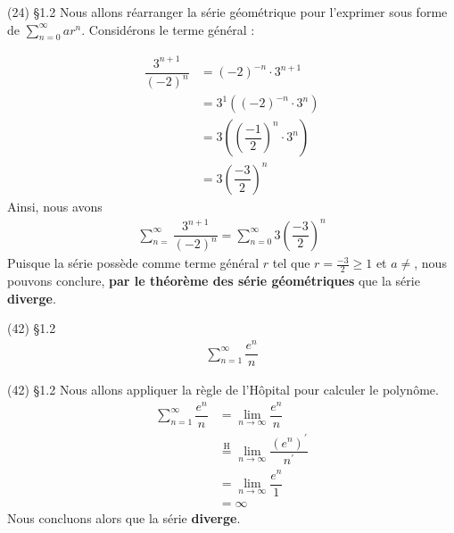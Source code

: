 \documentclass{report}
\begin{document}
\begin{multicols*}{3}
        \begin{Reponse}{(24) \S 1.2}{}
            Nous allons réarranger la série géométrique pour l'exprimer 
            sous forme de $\sum_{n=0}^{\infty }ar^n$. 
            Considérons le terme général : 

            \begin{align*}
                \dfrac{3^{n+1}}{(-2)^n} &= 
                (-2)^{-n}\cdot 3^{n+1} \\ 
                                    &=
                3^1\left( (-2)^{-n} \cdot 3^n \right) \\
                                    &= 
                3\left( \left(\dfrac{-1}{2}\right)^n \cdot 3^n \right) \\ 
                                    &= 
                3\left( \dfrac{-3}{2} \right)^n
            \end{align*}
            Ainsi, nous avons 
            \begin{align*}
                \sum_{n=}^{\infty}\dfrac{3^{n+1}}{(-2)^n} = 
                \sum_{n=0}^{\infty}3\left( \dfrac{-3}{2} \right)^n
            \end{align*}
            Puisque la série possède comme terme général $r$ tel que 
            $r =\frac{-3}{2} \geq 1$ et $a \neq$, nous pouvons 
            conclure, \textbf{par le théorème des série géométriques} 
            que la série \textbf{diverge}.   
           
        \end{Reponse}


        \begin{Exercice}{ (42) \S 1.2}{}
            \begin{align*}
                \sum_{n=1}^{\infty}\dfrac{e^n}{n}
            \end{align*}
        \end{Exercice}


        \begin{Reponse}{ (42) \S 1.2}{}
            Nous allons appliquer la règle de l'Hôpital pour calculer 
            le polynôme.  
            \begin{align*}
                \sum_{n=1}^{\infty}\dfrac{e^n}{n} &= 
                 \lim\limits_{n\to\infty}\dfrac{e^n}{n} \\ 
                                      &\overset{\mathrm{H}}{=}
            \lim\limits_{n\to\infty}\dfrac{(e^n)^{\prime}}{n^{\prime}} \\
                                    &=
            \lim\limits_{n\to\infty}\dfrac{e^n}{1} \\ 
                                    &= \infty
            \end{align*}
            Nous concluons alors que la série \textbf{diverge}.   
        \end{Reponse}




\end{multicols*}
\end{document}
